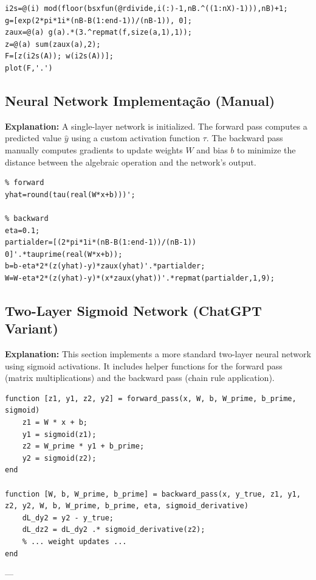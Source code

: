 \begin{lstlisting}
i2s=@(i) mod(floor(bsxfun(@rdivide,i(:)-1,nB.^((1:nX)-1))),nB)+1;
g=[exp(2*pi*1i*(nB-B(1:end-1))/(nB-1)), 0];
zaux=@(a) g(a).*(3.^repmat(f,size(a,1),1));
z=@(a) sum(zaux(a),2);
F=[z(i2s(A)); w(i2s(A))];
plot(F,'.')
\end{lstlisting}

\subsection{Neural Network Implementação (Manual)}
\textbf{Explanation:} A single-layer network is initialized. The forward pass computes a predicted value $\hat{y}$ using a custom activation function $\tau$. The backward pass manually computes gradients to update weights $W$ and bias $b$ to minimize the distance between the algebraic operation and the network's output.

\begin{lstlisting}
% forward
yhat=round(tau(real(W*x+b)))'; 

% backward
eta=0.1;  
partialder=[(2*pi*1i*(nB-B(1:end-1))/(nB-1)) 0]'.*tauprime(real(W*x+b));
b=b-eta*2*(z(yhat)-y)*zaux(yhat)'.*partialder;
W=W-eta*2*(z(yhat)-y)*(x*zaux(yhat))'.*repmat(partialder,1,9);
\end{lstlisting}

\subsection{Two-Layer Sigmoid Network (ChatGPT Variant)}
\textbf{Explanation:} This section implements a more standard two-layer neural network using sigmoid activations. It includes helper functions for the forward pass (matrix multiplications) and the backward pass (chain rule application).

\begin{lstlisting}
function [z1, y1, z2, y2] = forward_pass(x, W, b, W_prime, b_prime, sigmoid)
    z1 = W * x + b;
    y1 = sigmoid(z1);
    z2 = W_prime * y1 + b_prime;
    y2 = sigmoid(z2);
end

function [W, b, W_prime, b_prime] = backward_pass(x, y_true, z1, y1, z2, y2, W, b, W_prime, b_prime, eta, sigmoid_derivative)
    dL_dy2 = y2 - y_true;
    dL_dz2 = dL_dy2 .* sigmoid_derivative(z2);
    % ... weight updates ...
end
\end{lstlisting}

---

